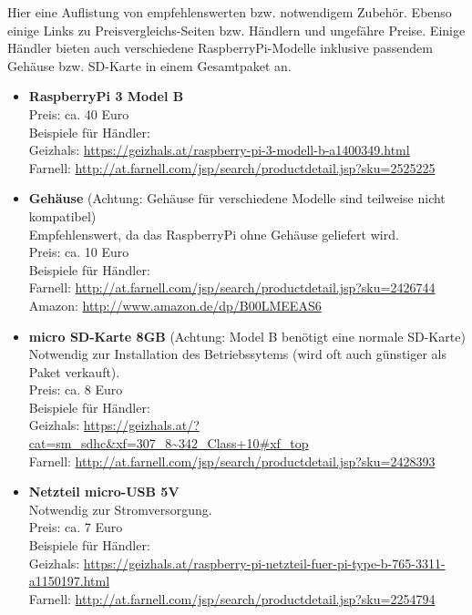 
Hier eine Auflistung von empfehlenswerten bzw. notwendigem Zubehör. Ebenso einige Links zu Preisvergleichs-Seiten bzw. Händlern und ungefähre Preise.
Einige Händler bieten auch verschiedene RaspberryPi-Modelle inklusive passendem Gehäuse bzw. SD-Karte in einem Gesamtpaket an.
\begin{itemize}
	\item \textbf{RaspberryPi 3 Model B}\\
		Preis: ca. 40 Euro\\
		Beispiele für Händler:\\
		Geizhals: \url{https://geizhals.at/raspberry-pi-3-modell-b-a1400349.html}\\
		Farnell: \url{http://at.farnell.com/jsp/search/productdetail.jsp?sku=2525225}
	\item \textbf{Gehäuse} (Achtung: Gehäuse für verschiedene Modelle sind teilweise nicht kompatibel)\\
		Empfehlenswert, da das RaspberryPi ohne Gehäuse geliefert wird.\\
		Preis: ca. 10 Euro\\
		Beispiele für Händler:\\
		Farnell: \url{http://at.farnell.com/jsp/search/productdetail.jsp?sku=2426744}\\
		Amazon: \url{http://www.amazon.de/dp/B00LMEEAS6}
	\item \textbf{micro SD-Karte 8GB} (Achtung: Model B benötigt eine normale SD-Karte)\\
		Notwendig zur Installation des Betriebssytems (wird oft auch günstiger als Paket verkauft).\\
		Preis: ca. 8 Euro\\
		Beispiele für Händler:\\
		Geizhals: \url{https://geizhals.at/?cat=sm_sdhc&xf=307_8~342_Class+10#xf_top}\\
		Farnell: \url{http://at.farnell.com/jsp/search/productdetail.jsp?sku=2428393}
	\item \textbf{Netzteil micro-USB 5V}\\
		Notwendig zur Stromversorgung.\\
		Preis: ca. 7 Euro\\
		Beispiele für Händler:\\
		Geizhals: \url{https://geizhals.at/raspberry-pi-netzteil-fuer-pi-type-b-765-3311-a1150197.html}\\
		Farnell: \url{http://at.farnell.com/jsp/search/productdetail.jsp?sku=2254794}
\end{itemize}

